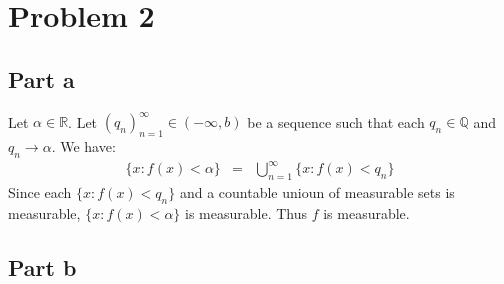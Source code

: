 \documentclass[12pt]{article}
\begin{document}
\clearpage
\section*{Problem 2}
\subsection*{Part a}
Let $\alpha \in \mathbb{R}$.
Let $(q_n)_{n=1}^{\infty} \in (-\infty,b)$ be a sequence such that each $q_n \in \mathbb{Q}$ and $q_n \rightarrow \alpha$.
We have:
\begin{eqnarray*}
\{x:f(x) < \alpha\} &=&
\bigcup_{n=1}^{\infty} \{x:f(x)<q_n\}
\end{eqnarray*}  
Since each $\{x:f(x)<q_n\}$ and a countable unioun of measurable sets is measurable, $\{x:f(x) < \alpha\}$ is measurable. Thus $f$ is measurable. 
\subsection*{Part b}
\end{document}
